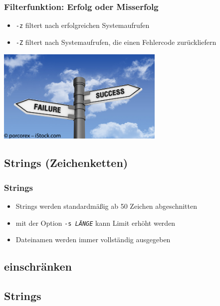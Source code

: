 \begin{frame}[fragile]
  \frametitle{Filterfunktion: Erfolg oder Misserfolg}

  \begin{itemize}
    \item \texttt{-z} filtert nach erfolgreichen Systemaufrufen
    \item \texttt{-Z} filtert nach Systemaufrufen, die einen Fehlercode zurückliefern
  \end{itemize}
  
  \bigskip

  \begin{center}
    \includegraphics[width=8cm]{../images/success-failure.jpg}
  \end{center}

\end{frame}

\subsection{Strings (Zeichenketten)}

\begin{frame}[fragile]
  \frametitle{Strings}

  \begin{itemize}
    \item Strings werden standardmäßig ab 50 Zeichen abgeschnitten
    \item mit der Option \texttt{-s \emph{LÄNGE}} kann Limit erhöht werden
    \item Dateinamen werden immer vollständig ausgegeben
  \end{itemize}

\end{frame}


\subsection{\strace{} einschränken}


\subsection{Strings}
